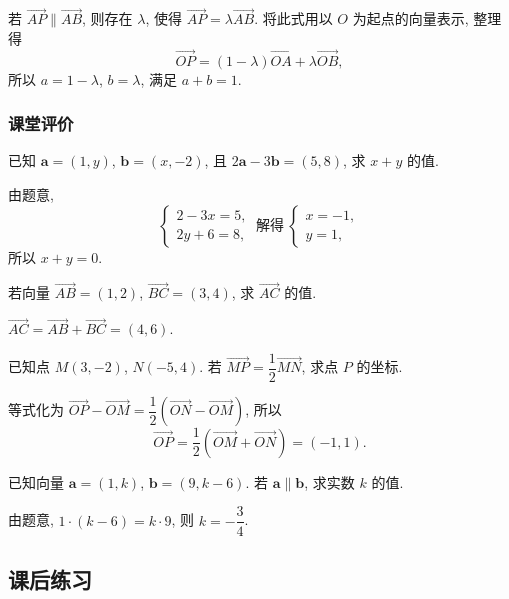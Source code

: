     若 $\overrightarrow{AP}\parallel \overrightarrow{AB}$, 则存在 $\lambda$, 使得 $\overrightarrow{AP}= \lambda\overrightarrow{AB}$. 将此式用以 $O$ 为起点的向量表示, 整理得
    \[\overrightarrow{OP}= 
    (1-\lambda)\overrightarrow{OA}+ \lambda\overrightarrow{OB},\]
    所以 $a= 1-\lambda$, $b= \lambda$, 满足 $a+b=1$.
\endsolution

\subsubsection{课堂评价}
\begin{exercise}
    已知 $\bm{a}=(1,y)$, $\bm{b}=(x,-2)$, 且 $2\bm{a}-3\bm{b}=(5,8)$, 求 $x+y$ 的值.
\end{exercise}
\beginsolution
    由题意,
    \[\left\{\!\!\begin{array}{l}
        2-3x= 5,\\
        2y+6= 8,
    \end{array}\right.\ \text{解得}\ 
    \left\{\!\!\begin{array}{l}
        x=-1,\\
        y=1,
    \end{array}\right.\]
    所以 $x+y=0$.
\endsolution

\begin{exercise}
    若向量 $\overrightarrow{AB}=(1,2)$, $\overrightarrow{BC}=(3,4)$,
    求 $\overrightarrow{AC}$ 的值.
\end{exercise}
\beginsolution
    $\overrightarrow{AC}= \overrightarrow{AB}+ \overrightarrow{BC}= (4,6)$.
\endsolution

\begin{exercise}
    已知点 $M(3,-2)$, $N(-5,4)$. 若 $\overrightarrow{MP}
      =\dfrac12\overrightarrow{MN}$, 求点 $P$ 的坐标.
\end{exercise}
\beginsolution
    等式化为 $\overrightarrow{OP}- \overrightarrow{OM}= \dfrac12(\overrightarrow{ON}- \overrightarrow{OM})$, 所以
    \[\overrightarrow{OP}
        = \frac12(\overrightarrow{OM}+ \overrightarrow{ON})
        = (-1,1).\]
\endsolution

\begin{exercise}
    已知向量 $\bm{a}=(1,k)$, $\bm{b}=(9,k-6)$. 若 $\bm{a}\parallel\bm{b}$, 求实数 $k$ 的值.
\end{exercise}
\beginsolution
    由题意, $1\cdot(k-6)= k\cdot 9$, 则 $k= -\dfrac34$.
\endsolution

\subsection{课后练习}

